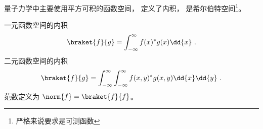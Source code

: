 
量子力学中主要使用平方可积的函数空间， 定义了内积， 是希尔伯特空间\footnote{严格来说要求是可测函数}。

一元函数空间的内积
\begin{equation}
\braket{f}{g} = \int_{-\infty}^{\infty} f(x)^* g(x) \dd{x}~.
\end{equation}
二元函数空间的内积
\begin{equation}
\braket{f}{g} = \int_{-\infty}^{\infty}\int_{-\infty}^{\infty} f(x, y)^* g(x, y) \dd{x}\dd{y}~.
\end{equation}
范数定义为 $\norm{f} = \braket{f}{f}$。
